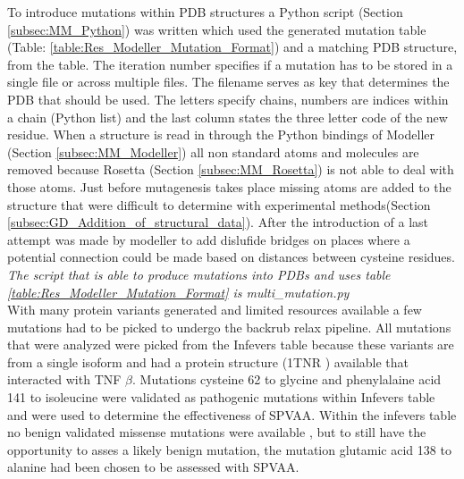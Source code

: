 	To introduce mutations within PDB structures a Python script (Section \ref{subsec:MM_Python}) was written which used the generated mutation table (Table: \ref{table:Res_Modeller_Mutation_Format}) and a matching PDB structure, from the table. 
	The iteration number specifies if a mutation has to be stored in a single file or across multiple files. 
	The filename serves as key that determines the PDB that should be used. 
	The letters specify chains, numbers are indices within a chain (Python list) and the last column states the three letter code of the new residue. 
	When a structure is read in through the Python bindings of Modeller (Section \ref{subsec:MM_Modeller}) all non standard atoms and molecules are removed because Rosetta (Section \ref{subsec:MM_Rosetta}) is not able to deal with those atoms.
	Just before mutagenesis takes place missing atoms are added to the structure that were difficult to determine with experimental methods(Section \ref{subsec:GD_Addition_of_structural_data}). After the introduction of a last attempt was made by modeller to add dislufide bridges on places where a potential connection could be made based on distances between cysteine residues.\\
	\textit{The script that is able to produce mutations into PDBs and uses table \ref{table:Res_Modeller_Mutation_Format} is multi\_mutation.py}\\
	
	With many protein variants generated and limited resources available a few mutations had to be picked to undergo the backrub relax pipeline. All mutations that were analyzed were picked from the Infevers table because these variants are from a single isoform and had a protein structure (1TNR \cite{banner_crystal_1993}) available that interacted with TNF $\beta$. 
	Mutations cysteine 62 to glycine and phenylalaine acid 141 to isoleucine were validated as pathogenic mutations within Infevers table and were used to determine the effectiveness of SPVAA. Within the infevers table no benign validated missense mutations were available \cite{aksentijevich_infevers_nodate}, but to still have the opportunity to asses a likely benign mutation, the mutation glutamic acid 138 to alanine had been chosen to be assessed with SPVAA.
	
	\newpage
	

